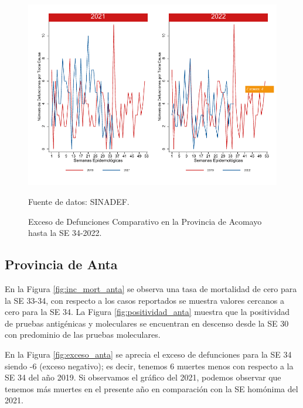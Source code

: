 \documentclass[12pt,a4paper,openany]{book}
\begin{document}
	\begin{figure}[h]
		\caption{Exceso de Defunciones Comparativo en la Provincia de Acomayo hasta la SE 34-2022.}\label{fig:exceso_acomayo}
		\begin{center}
			\includegraphics[width=0.7\linewidth]{../figuras/exceso_1.pdf}
		\end{center}
		{\footnotesize {Fuente de datos: SINADEF.}}
	\end{figure}
	
	\clearpage
	
	\subsection*{Provincia de Anta}
	\noindent En la Figura \ref{fig:inc_mort_anta} se observa una tasa de mortalidad de cero para la SE 33-34, con respecto a los casos reportados se muestra valores cercanos a cero para la SE 34. 
	\noindent La Figura
	\ref{fig:positividad_anta} muestra que la positividad de pruebas antigénicas y moleculares se encuentran en descenso desde la SE 30 con predominio de las pruebas moleculares. 
	
	En la Figura \ref{fig:exceso_anta} se aprecia el exceso de defunciones para la SE 34 siendo -6 (exceso negativo); es decir, tenemos 6 muertes menos con respecto a la SE 34 del año 2019. Si observamos el gráfico del 2021, podemos observar que tenemos más muertes en el presente año en comparación con la SE homónima del 2021.
	
\end{document}
